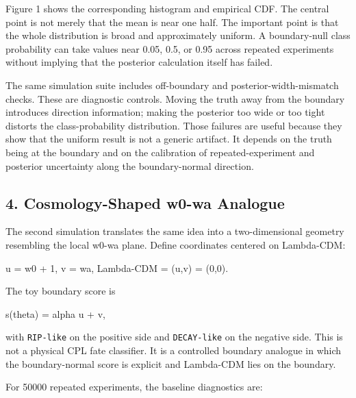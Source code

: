 \documentclass[
]{article}
\newenvironment{Shaded}{}{}
\newcommand{\NormalTok}[1]{#1}
\begin{document}
Figure 1 shows the corresponding histogram and empirical CDF. The
central point is not merely that the mean is near one half. The
important point is that the whole distribution is broad and
approximately uniform. A boundary-null class probability can take values
near 0.05, 0.5, or 0.95 across repeated experiments without implying
that the posterior calculation itself has failed.

The same simulation suite includes off-boundary and
posterior-width-mismatch checks. These are diagnostic controls. Moving
the truth away from the boundary introduces direction information;
making the posterior too wide or too tight distorts the
class-probability distribution. Those failures are useful because they
show that the uniform result is not a generic artifact. It depends on
the truth being at the boundary and on the calibration of
repeated-experiment and posterior uncertainty along the boundary-normal
direction.

\subsection{4. Cosmology-Shaped w0-wa
Analogue}\label{cosmology-shaped-w0-wa-analogue}

The second simulation translates the same idea into a two-dimensional
geometry resembling the local w0-wa plane. Define coordinates centered
on Lambda-CDM:

\begin{Shaded}
\begin{Highlighting}[]
\NormalTok{u = w0 + 1,}
\NormalTok{v = wa,}
\NormalTok{Lambda{-}CDM = (u,v) = (0,0).}
\end{Highlighting}
\end{Shaded}

The toy boundary score is

\begin{Shaded}
\begin{Highlighting}[]
\NormalTok{s(theta) = alpha u + v,}
\end{Highlighting}
\end{Shaded}

with \texttt{RIP-like} on the positive side and \texttt{DECAY-like} on
the negative side. This is not a physical CPL fate classifier. It is a
controlled boundary analogue in which the boundary-normal score is
explicit and Lambda-CDM lies on the boundary.

For 50000 repeated experiments, the baseline diagnostics are:
\end{document}
